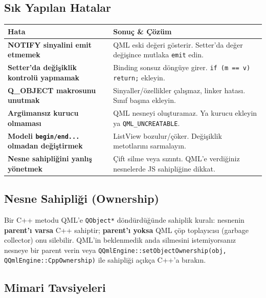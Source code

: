 \documentclass[11pt,a4paper]{article}
\newcommand{\kod}[1]{\texttt{\color{koyuGri}#1}}
\begin{document}
\subsection{Sık Yapılan Hatalar}

\begin{center}
\begin{tabularx}{\textwidth}{@{}>{\raggedright\arraybackslash\bfseries\color{kirmizi}}p{5cm} >{\raggedright\arraybackslash}X@{}}
\toprule
\rowcolor{kirmizi!12}\color{kirmizi}\textbf{Hata} & \color{kirmizi}\textbf{Sonuç \& Çözüm} \\
\midrule
NOTIFY sinyalini emit etmemek & QML eski değeri gösterir. Setter'da değer değişince mutlaka \kod{emit} edin. \\
\rowcolor{acikGri} Setter'da değişiklik kontrolü yapmamak & Binding sonsuz döngüye girer. \kod{if (m == v) return;} ekleyin. \\
Q\_OBJECT makrosunu unutmak & Sinyaller/özellikler çalışmaz, linker hatası. Sınıf başına ekleyin. \\
\rowcolor{acikGri} Argümansız kurucu olmaması & QML nesneyi oluşturamaz. Ya kurucu ekleyin ya \kod{QML\_UNCREATABLE}. \\
Modeli \kod{begin/end...} olmadan değiştirmek & ListView bozulur/çöker. Değişiklik metotlarını sarmalayın. \\
\rowcolor{acikGri} Nesne sahipliğini yanlış yönetmek & Çift silme veya sızıntı. QML'e verdiğiniz nesnelerde JS sahipliğine dikkat. \\
\bottomrule
\end{tabularx}
\end{center}

\subsection{Nesne Sahipliği (Ownership)}

\begin{bilgikutu}
Bir C++ metodu QML'e \kod{QObject*} döndürdüğünde sahiplik kuralı: nesnenin
\textbf{parent'ı varsa} C++ sahiptir; \textbf{parent'ı yoksa} QML çöp toplayıcısı
(garbage collector) onu silebilir. QML'in beklenmedik anda silmesini istemiyorsanız
nesneye bir parent verin veya \kod{QQmlEngine::setObjectOwnership(obj,
QQmlEngine::CppOwnership)} ile sahipliği açıkça C++'a bırakın.
\end{bilgikutu}

\subsection{Mimari Tavsiyeleri}
\end{document}

